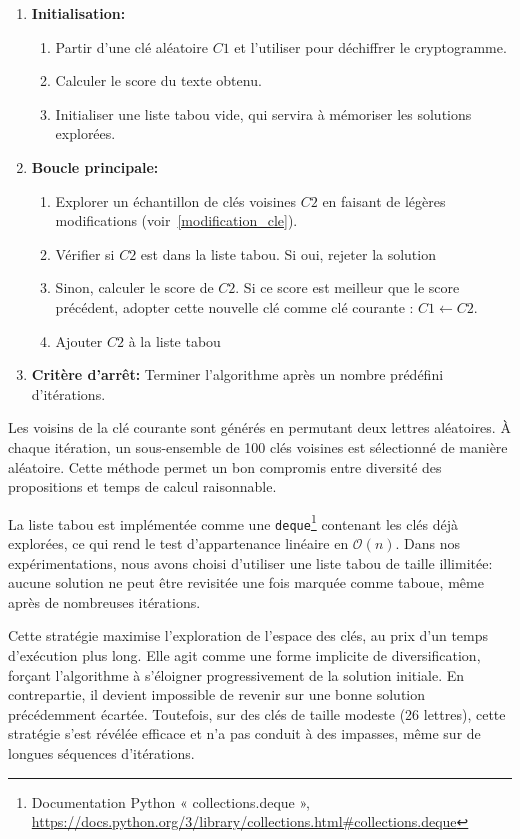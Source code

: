 \documentclass[a4paper]{article}
\begin{document}
\begin{enumerate}
    \item \textbf{Initialisation:}
    \begin{enumerate}
        \item Partir d'une clé aléatoire $C1$ et l'utiliser pour déchiffrer le cryptogramme.
        \item Calculer le score du texte obtenu.
        \item Initialiser une liste tabou vide, qui servira à mémoriser les solutions explorées.
    \end{enumerate}
    \item \textbf{Boucle principale:}
    \begin{enumerate}[label= (\alph*)]
        \item Explorer un échantillon de clés voisines $C2$ en faisant de légères modifications (voir~\ref{modification_cle}).
        \item Vérifier si $C2$ est dans la liste tabou. Si oui, rejeter la solution
        \item Sinon, calculer le score de $C2$. Si ce score est meilleur que le score précédent, adopter cette nouvelle clé comme clé courante : $C1 \leftarrow C2$.
        \item Ajouter $C2$ à la liste tabou 
    \end{enumerate}
    \item \textbf{Critère d'arrêt:} Terminer l'algorithme après un nombre prédéfini d'itérations.
\end{enumerate}

Les voisins de la clé courante sont générés en permutant deux lettres aléatoires. À chaque itération, un sous-ensemble de 100 clés voisines est sélectionné de manière aléatoire. Cette méthode permet un bon compromis entre diversité des propositions et temps de calcul raisonnable.

\vspace{0.5em}

La liste tabou est implémentée comme une \texttt{deque}\footnote{Documentation Python « collections.deque », \url{https://docs.python.org/3/library/collections.html\#collections.deque}} contenant les clés déjà explorées, ce qui rend le test d’appartenance linéaire en \(\mathcal{O}(n)\). Dans nos expérimentations, nous avons choisi d’utiliser une liste tabou de taille illimitée: aucune solution ne peut être revisitée une fois marquée comme taboue, même après de nombreuses itérations.

Cette stratégie maximise l’exploration de l’espace des clés, au prix d’un temps d’exécution plus long. Elle agit comme une forme implicite de diversification, forçant l’algorithme à s’éloigner progressivement de la solution initiale. En contrepartie, il devient impossible de revenir sur une bonne solution précédemment écartée. Toutefois, sur des clés de taille modeste (26 lettres), cette stratégie s’est révélée efficace et n’a pas conduit à des impasses, même sur de longues séquences d’itérations.
\end{document}
